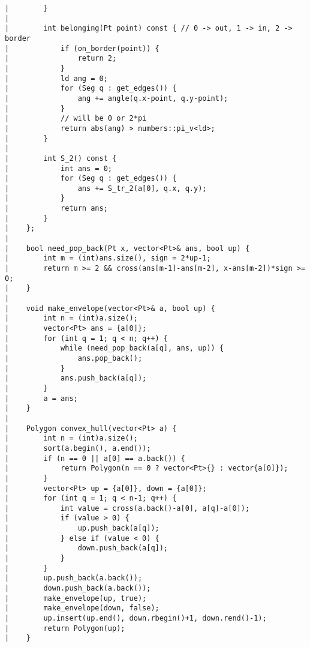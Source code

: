 \documentclass[a4paper, 10pt]{article}
\begin{document}
\begin{center}
\begin{verbatim}
|        }
|    
|        int belonging(Pt point) const { // 0 -> out, 1 -> in, 2 -> border
|            if (on_border(point)) {
|                return 2;
|            }
|            ld ang = 0;
|            for (Seg q : get_edges()) {
|                ang += angle(q.x-point, q.y-point);
|            }
|            // will be 0 or 2*pi
|            return abs(ang) > numbers::pi_v<ld>;
|        }
|    
|        int S_2() const {
|            int ans = 0;
|            for (Seg q : get_edges()) {
|                ans += S_tr_2(a[0], q.x, q.y);
|            }
|            return ans;
|        }
|    };
|    
|    bool need_pop_back(Pt x, vector<Pt>& ans, bool up) {
|        int m = (int)ans.size(), sign = 2*up-1;
|        return m >= 2 && cross(ans[m-1]-ans[m-2], x-ans[m-2])*sign >= 0;
|    }
|    
|    void make_envelope(vector<Pt>& a, bool up) {
|        int n = (int)a.size();
|        vector<Pt> ans = {a[0]};
|        for (int q = 1; q < n; q++) {
|            while (need_pop_back(a[q], ans, up)) {
|                ans.pop_back();
|            }
|            ans.push_back(a[q]);
|        }
|        a = ans;
|    }
|    
|    Polygon convex_hull(vector<Pt> a) {
|        int n = (int)a.size();
|        sort(a.begin(), a.end());
|        if (n == 0 || a[0] == a.back()) {
|            return Polygon(n == 0 ? vector<Pt>{} : vector{a[0]});
|        }
|        vector<Pt> up = {a[0]}, down = {a[0]};
|        for (int q = 1; q < n-1; q++) {
|            int value = cross(a.back()-a[0], a[q]-a[0]);
|            if (value > 0) {
|                up.push_back(a[q]);
|            } else if (value < 0) {
|                down.push_back(a[q]);
|            }
|        }
|        up.push_back(a.back());
|        down.push_back(a.back());
|        make_envelope(up, true);
|        make_envelope(down, false);
|        up.insert(up.end(), down.rbegin()+1, down.rend()-1);
|        return Polygon(up);
|    }
\end{verbatim}


\end{center}
\end{document}
